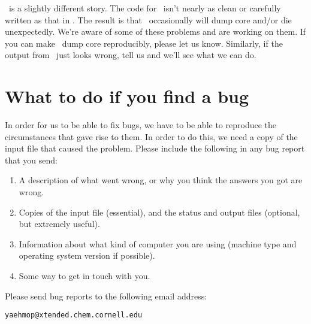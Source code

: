 \viewprog\ is a slightly different story.  The code for \viewprog\
isn't nearly as clean or carefully written as that in \calcprog.  The
result is that \viewprog\ occasionally will dump core and/or die
unexpectedly. We're aware of some of these problems and are working on
them.  If you can make \viewprog\ dump core reproducibly, please let
us know.  Similarly, if the output from \viewprog\ just looks wrong,
tell us and we'll see what we can do.

\section{What to do if you find a bug}

In order for us to be able to fix bugs, we have to be able to reproduce
the circumstances that gave rise to them.  In order to do this, we need
a copy of the input file that caused the problem.  Please include the
following in any bug report that you send:

\begin{enumerate}

\item A description of what went wrong, or why you think the answers
you got are wrong.

\item Copies of the input file (essential), and the status and output
files (optional, but extremely useful).

\item Information about what kind of computer you are using (machine
type and operating system version if possible).

\item Some way to get in touch with you.

\end{enumerate}

Please send bug reports to the following email address:

{\tt yaehmop@xtended.chem.cornell.edu}

